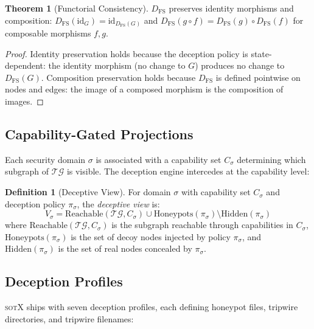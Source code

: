 \documentclass[11pt,a4paper]{article}
\theoremstyle{definition}
\newtheorem{definition}{Definition}[section]
\newtheorem{theorem}{Theorem}[section]
\theoremstyle{remark}
\newcommand{\TG}{\ensuremath{\mathcal{TG}}}
\newcommand{\sotx}{\textsc{sotX}}
\begin{document}
\begin{theorem}[Functorial Consistency]
\label{thm:functorial}
$D_{\mathrm{FS}}$ preserves identity morphisms and composition:
$D_{\mathrm{FS}}(\mathrm{id}_G) = \mathrm{id}_{D_{\mathrm{FS}}(G)}$
and $D_{\mathrm{FS}}(g \circ f) = D_{\mathrm{FS}}(g) \circ
D_{\mathrm{FS}}(f)$ for composable morphisms $f, g$.
\end{theorem}

\begin{proof}
Identity preservation holds because the deception policy is
state-dependent: the identity morphism (no change to $G$) produces
no change to $D_{\mathrm{FS}}(G)$. Composition preservation holds
because $D_{\mathrm{FS}}$ is defined pointwise on nodes and edges:
the image of a composed morphism is the composition of images.
\end{proof}

\subsection{Capability-Gated Projections}
\label{sec:deception-projections}

Each security domain $\sigma$ is associated with a capability set
$C_\sigma$ determining which subgraph of $\TG$ is visible. The
deception engine intercedes at the capability level:

\begin{definition}[Deceptive View]
\label{def:deceptive-view}
For domain $\sigma$ with capability set $C_\sigma$ and deception
policy $\pi_\sigma$, the \emph{deceptive view} is:
\[
V_\sigma = \mathrm{Reachable}(\TG, C_\sigma) \cup
  \mathrm{Honeypots}(\pi_\sigma) \setminus
  \mathrm{Hidden}(\pi_\sigma)
\]
where $\mathrm{Reachable}(\TG, C_\sigma)$ is the subgraph reachable
through capabilities in $C_\sigma$, $\mathrm{Honeypots}(\pi_\sigma)$
is the set of decoy nodes injected by policy $\pi_\sigma$, and
$\mathrm{Hidden}(\pi_\sigma)$ is the set of real nodes concealed
by $\pi_\sigma$.
\end{definition}

\subsection{Deception Profiles}
\label{sec:deception-profiles}

\sotx{} ships with seven deception profiles, each defining honeypot files,
tripwire directories, and tripwire filenames:
\end{document}
